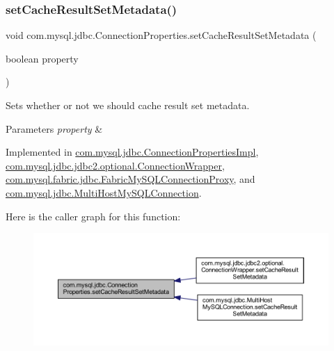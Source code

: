\subsubsection{\texorpdfstring{set\+Cache\+Result\+Set\+Metadata()}{setCacheResultSetMetadata()}}
{\footnotesize\ttfamily void com.\+mysql.\+jdbc.\+Connection\+Properties.\+set\+Cache\+Result\+Set\+Metadata (\begin{DoxyParamCaption}\item[{boolean}]{property }\end{DoxyParamCaption})}

Sets whether or not we should cache result set metadata.


\begin{DoxyParams}{Parameters}
{\em property} & \\
\hline
\end{DoxyParams}


Implemented in \mbox{\hyperlink{classcom_1_1mysql_1_1jdbc_1_1_connection_properties_impl_ae60b4c7199487d2b0b76cbb340bf9c55}{com.\+mysql.\+jdbc.\+Connection\+Properties\+Impl}}, \mbox{\hyperlink{classcom_1_1mysql_1_1jdbc_1_1jdbc2_1_1optional_1_1_connection_wrapper_a549d3499e7fd8015aa2d761651d9f490}{com.\+mysql.\+jdbc.\+jdbc2.\+optional.\+Connection\+Wrapper}}, \mbox{\hyperlink{classcom_1_1mysql_1_1fabric_1_1jdbc_1_1_fabric_my_s_q_l_connection_proxy_a4e71da539f2c05cf70421a5c05d7e4b2}{com.\+mysql.\+fabric.\+jdbc.\+Fabric\+My\+S\+Q\+L\+Connection\+Proxy}}, and \mbox{\hyperlink{classcom_1_1mysql_1_1jdbc_1_1_multi_host_my_s_q_l_connection_a2607114d6964b709318697a7aa065f5f}{com.\+mysql.\+jdbc.\+Multi\+Host\+My\+S\+Q\+L\+Connection}}.

Here is the caller graph for this function\+:\nopagebreak
\begin{figure}[H]
\begin{center}
\leavevmode
\includegraphics[width=350pt]{interfacecom_1_1mysql_1_1jdbc_1_1_connection_properties_abf45e0839d48fe28bb22d334118f807f_icgraph}
\end{center}
\end{figure}
\mbox{\label{interfacecom_1_1mysql_1_1jdbc_1_1_connection_properties_a1c4d96777532b47bfa433c3083557cae}} 
